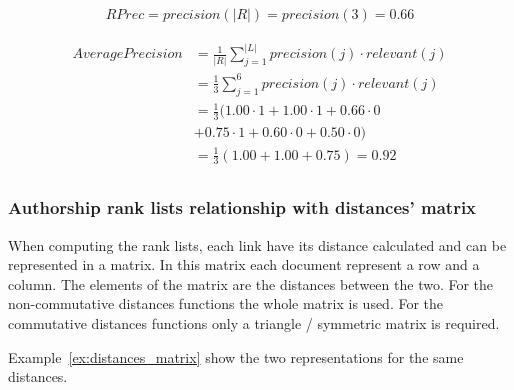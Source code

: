\begin{example}
  \vspace{0.5cm}

  \begin{subexample}{\linewidth}
    \begin{equation}
      \begin{split}
        RPrec = precision(|R|) = precision(3) = 0.66
      \end{split}
    \end{equation}
  \end{subexample}

  \vspace{0.5cm}

  \begin{subexample}{\linewidth}
    \begin{equation}
      \begin{split}
        AveragePrecision &= \frac{1}{|R|} \sum_{j=1}^{|L|} precision(j) \cdot relevant(j) \\
                         &= \frac{1}{3} \sum_{j=1}^{6} precision(j) \cdot relevant(j) \\
                         &= \frac{1}{3} ( 1.00 \cdot 1 + 1.00 \cdot 1 + 0.66 \cdot 0 \\
                         &+ 0.75 \cdot 1 + 0.60 \cdot 0 + 0.50 \cdot 0) \\
                         &= \frac{1}{3} (1.00 + 1.00 + 0.75) = 0.92 \\
      \end{split}
    \end{equation}
  \end{subexample}

\end{example}

\subsubsection{Authorship rank lists relationship with distances' matrix \label{sec:distances_matrix}}

When computing the rank lists, each link have its distance calculated and can be represented in a matrix.
In this matrix each document represent a row and a column.
The elements of the matrix are the distances between the two.
For the non-commutative distances functions the whole matrix is used.
For the commutative distances functions only a triangle / symmetric matrix is required.

Example~\ref{ex:distances_matrix} show the two representations for the same distances.

